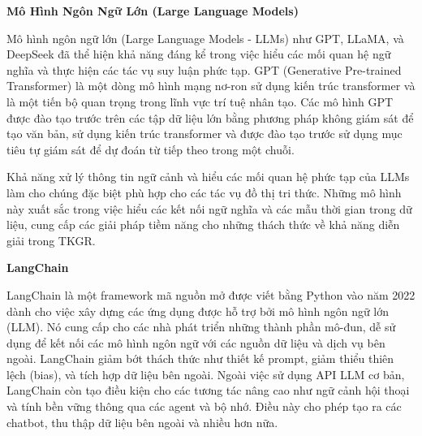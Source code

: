 \vspace{1em}
\textbf{Mô Hình Ngôn Ngữ Lớn (Large Language Models)}

Mô hình ngôn ngữ lớn (Large Language Models - LLMs) như GPT, LLaMA, và DeepSeek đã thể hiện khả năng đáng kể trong việc hiểu các mối quan hệ ngữ nghĩa và thực hiện các tác vụ suy luận phức tạp. GPT (Generative Pre-trained Transformer) là một dòng mô hình mạng nơ-ron sử dụng kiến trúc transformer và là một tiến bộ quan trọng trong lĩnh vực trí tuệ nhân tạo. Các mô hình GPT được đào tạo trước trên các tập dữ liệu lớn bằng phương pháp không giám sát để tạo văn bản, sử dụng kiến trúc transformer và được đào tạo trước sử dụng mục tiêu tự giám sát để dự đoán từ tiếp theo trong một chuỗi.


Khả năng xử lý thông tin ngữ cảnh và hiểu các mối quan hệ phức tạp của LLMs làm cho chúng đặc biệt phù hợp cho các tác vụ đồ thị tri thức. Những mô hình này xuất sắc trong việc hiểu các kết nối ngữ nghĩa và các mẫu thời gian trong dữ liệu, cung cấp các giải pháp tiềm năng cho những thách thức về khả năng diễn giải trong TKGR.

\vspace{1em}
\textbf{LangChain}

LangChain là một framework mã nguồn mở được viết bằng Python vào năm 2022 dành cho việc xây dựng các ứng dụng được hỗ trợ bởi mô hình ngôn ngữ lớn (LLM). Nó cung cấp cho các nhà phát triển những thành phần mô-đun, dễ sử dụng để kết nối các mô hình ngôn ngữ với các nguồn dữ liệu và dịch vụ bên ngoài. LangChain giảm bớt thách thức như thiết kế prompt, giảm thiểu thiên lệch (bias), và tích hợp dữ liệu bên ngoài. Ngoài việc sử dụng API LLM cơ bản, LangChain còn tạo điều kiện cho các tương tác nâng cao như ngữ cảnh hội thoại và tính bền vững thông qua các agent và bộ nhớ. Điều này cho phép tạo ra các chatbot, thu thập dữ liệu bên ngoài và nhiều hơn nữa.

